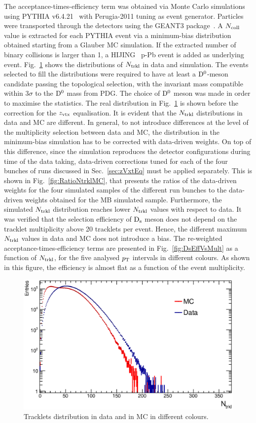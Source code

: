 The acceptance-times-efficiency term was obtained via Monte Carlo simulations
using PYTHIA v6.4.21~\cite{Sjostrand:2006za} with Perugia-2011 tuning as event generator.  
Particles were transported through the detectors using the GEANT3 package~\cite{Brun:1994aa}.
A $N_{\rm coll}$ value is extracted for each PYTHIA event via a minimum-bias 
distribution obtained starting from a Glauber MC simulation. If the 
extracted number of binary collisions is larger than 1, a HIJING~\cite{Wang:1991hta} p-Pb 
event is added as underlying event. 
Fig.~\ref{fig:NtrklDataMC} shows the distributions of $N_{\rm trkl}$ in data and simulation.
The events selected to fill the distributions were required to have at least a ${\rm D^0}$-meson candidate 
passing the topological selection, with the invariant mass compatible within 3$\sigma$ to the ${\rm D^0}$ mass from PDG.
The choice of ${\rm D^0}$ meson was made in order to maximise the statistics.
The real distribution in Fig.~\ref{fig:NtrklDataMC} is shown before the correction for the $z_{\rm vtx}$ equalisation. 
It is evident that the $N_{\rm trkl}$ distributions in data and MC are different.
In general, to not introduce differences at the level of the multiplicity selection between data and MC, 
the distribution in the minimum-bias simulation has to be corrected
with data-driven weights. On top of this difference, since the simulation reproduces 
the detector configurations during time of the data taking, 
data-driven corrections tuned for each of the four bunches of runs discussed in Sec.~\ref{sec:zVxtEq}
must be applied separately. This is shown in Fig.~\ref{fig:RatioNtrklMC}, that presents the ratios of the data-driven
weights for the four simulated samples of the different run bunches to the data-driven
weights obtained for the MB simulated sample.
Furthermore, the simulated $N_{\rm trkl}$ distribution reaches
lower $N_{\rm trkl}$ values with respect to data. It was verified 
that the selection efficiency of ${\rm D_s}$ meson does not depend on
the tracklet multiplicity above 20 tracklets per event. Hence, the different
maximum $N_{\rm trkl}$ values in data and MC does not introduce a bias.
The re-weighted acceptance-times-efficiency terms are presented in 
Fig.~\ref{fig:DsEffVsMult} as a function of $N_{\rm trkl}$, for the five analysed $p_{\rm T}$ intervals
in different colours. As shown in this figure, the efficiency is almost flat 
as a function of the event multiplicity.\\


\begin{figure}[h]
\centering
 \includegraphics[width=.7\textwidth]{FigCap6/NtrkDistrDDataMC.eps}
 \caption{Tracklets distribution in data and in MC in different colours.}
 \label{fig:NtrklDataMC}
\end{figure}


